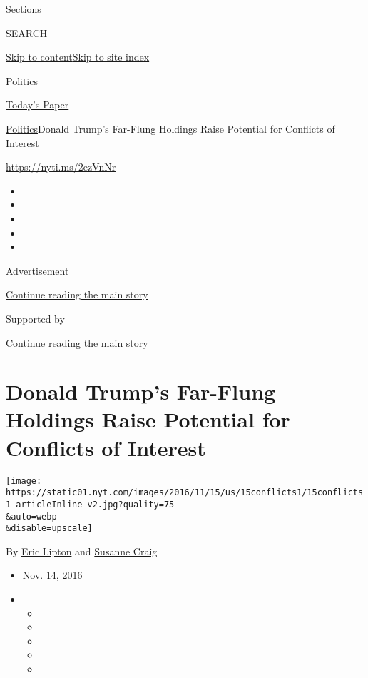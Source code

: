 Sections

SEARCH

\protect\hyperlink{site-content}{Skip to
content}\protect\hyperlink{site-index}{Skip to site index}

\href{https://www.nytimes.com/section/politics}{Politics}

\href{https://myaccount.nytimes.com/auth/login?response_type=cookie\&client_id=vi}{}

\href{https://www.nytimes.com/section/todayspaper}{Today's Paper}

\href{/section/politics}{Politics}\textbar{}Donald Trump's Far-Flung
Holdings Raise Potential for Conflicts of Interest

\url{https://nyti.ms/2ezVnNr}

\begin{itemize}
\item
\item
\item
\item
\item
\end{itemize}

Advertisement

\protect\hyperlink{after-top}{Continue reading the main story}

Supported by

\protect\hyperlink{after-sponsor}{Continue reading the main story}

\hypertarget{donald-trumps-far-flung-holdings-raise-potential-for-conflicts-of-interest}{%
\section{Donald Trump's Far-Flung Holdings Raise Potential for Conflicts
of
Interest}\label{donald-trumps-far-flung-holdings-raise-potential-for-conflicts-of-interest}}

\texttt{[image: https://static01.nyt.com/images/2016/11/15/us/15conflicts1/15conflicts1-articleInline-v2.jpg?quality=75\\\&auto=webp\\\&disable=upscale]}

By \href{http://www.nytimes.com/by/eric-lipton}{Eric Lipton} and
\href{http://www.nytimes.com/by/susanne-craig}{Susanne Craig}

\begin{itemize}
\item
  Nov. 14, 2016
\item
  \begin{itemize}
  \item
  \item
  \item
  \item
  \item
  \end{itemize}
\end{itemize}

